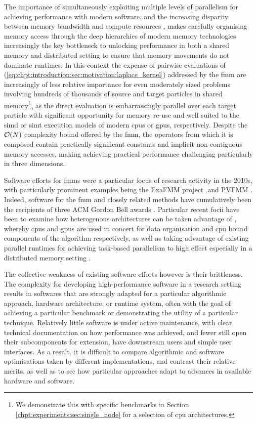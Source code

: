 The importance of simultaneously exploiting multiple levels of parallelism for achieving performance with modern software, and the increasing disparity between memory bandwidth and compute resources \cite{dongarra2017extreme}, makes carefully organising memory access through the deep hierarchies of modern memory technologies increasingly the key bottleneck to unlocking performance in both a shared memory and distributed setting to ensure that memory movements do not dominate runtimes. In this context the expense of pairwise evaluations of (\ref{eq:chpt:introduction:sec:motivation:laplace_kernel}) addressed by the \acrshort{fmm} are increasingly of less relative importance for even moderately sized problems involving hundreds of thousands of source and target particles in shared memory\footnote{We demonstrate this with specific benchmarks in Section \ref{chpt:experiments:sec:single_node} for a selection of \acrshort{cpu} architectures.}, as the direct evaluation is embarrassingly parallel over each target particle with significant opportunity for memory re-use and well suited to the \acrshort{simd} or \acrshort{simt} execution models of modern \glspl{cpu} or \glspl{gpu}, respectively. Despite the $\mathcal{O}(N)$ complexity bound offered by the \acrshort{fmm}, the operators from which it is composed contain practically significant constants and implicit non-contiguous memory accesses, making achieving practical performance challenging particularly in three dimensions.

Software efforts for \glspl{fmm} were a particular focus of research activity in the 2010s, with particularly prominent examples being the ExaFMM project \cite{barba2011exafmm, wang2021exafmm},and PVFMM \cite{malhotra2015pvfmm}. Indeed, software for the \acrshort{fmm} and closely related methods have cumulatively been the recipients of three ACM Gordon Bell awards \cite{bell2017look}. Particular recent focii have been to examine how heterogenous architectures can be taken advantage of \cite{malhotra2015pvfmm}, whereby \glspl{cpu} and \glspl{gpu} are used in concert for data organisation and \acrshort{cpu} bound components of the algorithm respectively, as well as taking advantage of existing parallel runtimes for achieving task-based parallelism to high effect especially in a distributed memory setting \cite{bramas2020tbfmm, agullo2014task}.

The collective weakness of existing software efforts however is their brittleness. The complexity for developing high-performance software in a research setting results in softwares that are strongly adapted for a particular algorithmic approach, hardware architecture, or runtime system, often with the goal of achieving a particular benchmark or demonstrating the utility of a particular technique. Relatively little software is under active maintenance, with clear technical documentation on how performance was achieved, and fewer still open their subcomponents for extension, have downstream users and simple user interfaces. As a result, it is difficult to compare algorithmic and software optimisations taken by different implementations, and contrast their relative merits, as well as to see how particular approaches adapt to advances in available hardware and software.


